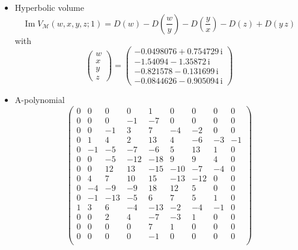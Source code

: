\documentclass[12pt,reqno]{amsart}
\numberwithin{equation}{section}
\renewcommand{\Im}{\operatorname{Im}}
\newcommand{\I}{\mathrm{i}}
\begin{document}
\begin{itemize}
\item Hyperbolic volume
  \begin{equation*}
    \Im V_{\mathcal{M}}(w,x,y,z; 1)
    =
    D(w) - D\left(\frac{w}{y}\right)
    - D\left(\frac{y}{x}\right)
    - D(z) + D\left(y \, z\right)
  \end{equation*}
  with
  \begin{equation*}
    \begin{pmatrix}
      w \\ x\\ y \\ z
    \end{pmatrix}
    =
    \begin{pmatrix}
       -0.0498076 + 0.754729 \, \I
       \\
       -1.54094 - 1.35872 \, \I
       \\
       -0.821578 - 0.131699 \, \I
       \\
       -0.0844626 - 0.905094 \, \I
    \end{pmatrix}
  \end{equation*}


\item A-polynomial
  \begin{equation*}
    \begin{pmatrix}
      0 & 0 & 0 & 0 & 1 & 0 & 0 & 0 & 0 \\
      0 & 0 & 0 & -1 & -7 & 0 & 0 & 0 & 0 \\
      0 & 0 & -1 & 3 & 7 & -4 & -2 & 0 & 0 \\
      0 & 1 & 4 & 2 & 13 & 4 & -6 & -3 & -1 \\
      0 & -1 & -5 & -7 & -6 & 5 & 13 & 1 & 0 \\
      0 & 0 & -5 & -12 & -18 & 9 & 9 & 4 & 0 \\
      0 & 0 & 12 & 13 & -15 & -10 & -7 & -4 & 0 \\
      0 & 4 & 7 & 10 & 15 & -13 & -12 & 0 & 0 \\
      0 & -4 & -9& -9  & 18 & 12 & 5 & 0 & 0 \\
      0 & -1 & -13 & -5  & 6 & 7 & 5 & 1 & 0 \\
      1 & 3 & 6 & -4  & -13 & -2 & -4 & -1 & 0 \\
      0 & 0 & 2 & 4  & -7 & -3 & 1 & 0 & 0 \\
      0 & 0 & 0 & 0  & 7 & 1 & 0 & 0 & 0 \\
      0 & 0 & 0 & 0  & -1 & 0 & 0 & 0 & 0 \\
    \end{pmatrix}
  \end{equation*}
\end{itemize}
\end{document}
